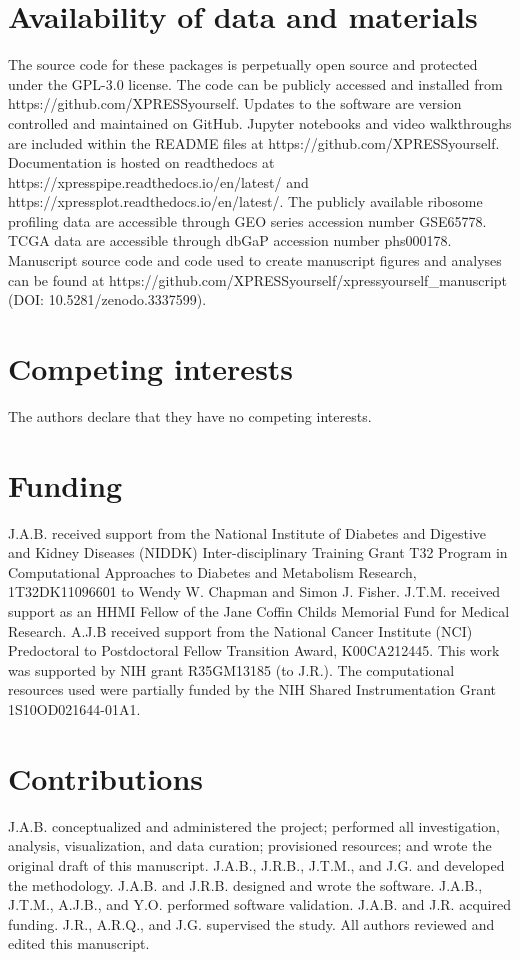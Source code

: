 \documentclass[10pt, oneside]{article}
\begin{document}
\section*{Availability of data and materials}
The source code for these packages is perpetually open source and protected under the GPL-3.0 license. The code can be publicly accessed and installed from https://github.com/XPRESSyourself. Updates to the software are version controlled and maintained on GitHub. Jupyter notebooks and video walkthroughs are included within the README files at https://github.com/XPRESSyourself. Documentation is hosted on readthedocs \cite{readthedocs} at https://xpresspipe.readthedocs.io/en/latest/ and https://xpressplot.readthedocs.io/en/latest/. The publicly available ribosome profiling data are accessible through GEO series accession number GSE65778. TCGA data are accessible through dbGaP accession number phs000178. Manuscript source code and code used to create manuscript figures and analyses can be found at https://github.com/XPRESSyourself/xpressyourself\_manuscript (DOI: 10.5281/zenodo.3337599).

\section*{Competing interests}
The authors declare that they have no competing interests.

\section*{Funding}
J.A.B. received support from the National Institute of Diabetes and Digestive and Kidney Diseases (NIDDK) Inter-disciplinary Training Grant T32 Program in Computational Approaches to Diabetes and Metabolism Research, 1T32DK11096601 to Wendy W. Chapman and Simon J. Fisher. J.T.M. received support as an HHMI Fellow of the Jane Coffin Childs Memorial Fund for Medical Research. A.J.B received support from the National Cancer Institute (NCI) Predoctoral to Postdoctoral Fellow Transition Award, K00CA212445. This work was supported by NIH grant R35GM13185 (to J.R.). The computational resources used were partially funded by the NIH Shared Instrumentation Grant 1S10OD021644-01A1.

\section*{Contributions}
J.A.B. conceptualized and administered the project; performed all investigation, analysis, visualization, and data curation; provisioned resources; and wrote the original draft of this manuscript. J.A.B., J.R.B., J.T.M., and J.G. and developed the methodology. J.A.B. and J.R.B. designed and wrote the software. J.A.B., J.T.M., A.J.B., and Y.O. performed software validation. J.A.B. and J.R. acquired funding. J.R., A.R.Q., and J.G. supervised the study. All authors reviewed and edited this manuscript.
\end{document}
